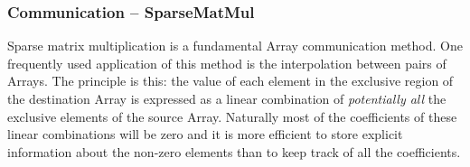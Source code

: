  
\setlength{\oldparskip}{\parskip}
\setlength{\parskip}{1.5ex}
\setlength{\oldparindent}{\parindent}
\setlength{\parindent}{0pt}
\setlength{\oldbaselineskip}{\baselineskip}
\setlength{\baselineskip}{11pt}
 
\def\bv{\begin{verbatim}}
\def\ev{\end{verbatim}}
\def\be{\begin{equation}}
\def\ee{\end{equation}}
\def\bea{\begin{eqnarray}}
\def\eea{\end{eqnarray}}
\def\bi{\begin{itemize}}
\def\ei{\end{itemize}}
\def\bn{\begin{enumerate}}
\def\en{\end{enumerate}}
\def\bd{\begin{description}}
\def\ed{\end{description}}
\def\({\left (}
\def\){\right )}
\def\[{\left [}
\def\]{\right ]}
\def\<{\left  \langle}
\def\>{\right \rangle}
\def\cI{{\cal I}}
\def\diag{\mathop{\rm diag}}
\def\tr{\mathop{\rm tr}}


 

  
   \subsubsection{Communication -- SparseMatMul}
   \label{Array:SparseMatMul}
   
   Sparse matrix multiplication is a fundamental Array communication method. One
   frequently used application of this method is the interpolation between pairs
   of Arrays. The principle is this: the value of each element in the exclusive 
   region of the destination Array is expressed as a linear combination of {\em 
   potentially all} the exclusive elements of the source Array. Naturally most of
   the coefficients of these linear combinations will be zero and it is more 
   efficient to store explicit information about the non-zero elements than to 
   keep track of all the coefficients.
  
